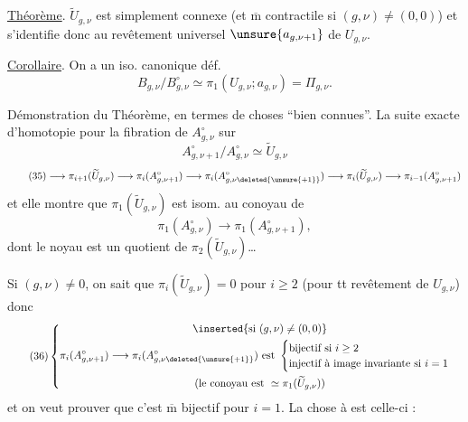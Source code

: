 \uline{Théorème}. $\widetilde U_{g,\nu}$ est simplement connexe  (et $\overline{\mathrm m}$ contractile si $(g,\nu)\ne(0,0)$) et s'identifie donc au revêtement universel   $\unsure{a_{g,\nu+1}}$ de $U_{g,\nu}$.


\uline{Corollaire}. On a un iso. canonique déf.
\[
\tag{34}
B_{g,\nu}/B_{g,\nu}^{\circ}\simeq\pi_1(U_{g,\nu};a_{g,\nu})=\Pi_{g,\nu}.
\]

Démonstration du Théorème, en termes de choses ``bien connues''. La  suite exacte d'homotopie pour la fibration de $A_{g,\nu}^{\circ}$ sur
\[
A_{g,\nu+1}^{\circ}/A_{g,\nu}^{\circ}\simeq\widetilde U_{g,\nu}
\]
\[
\tag{35}
\longrightarrow\pi_{i+1}(\widetilde U_{g,\nu})
\longrightarrow\pi_i(A_{g,\nu+1}^{\circ})
\longrightarrow\pi_i(A_{g,\nu\deleted{\unsure{+1}}}^{\circ})
\longrightarrow\pi_i(\widetilde U_{g,\nu})
\longrightarrow\pi_{i-1}(A_{g,\nu+1}^{\circ})
\]
et elle montre que $\pi_1(\widetilde U_{g,\nu})$ est isom. au conoyau de
\[
\pi_1(A_{g,\nu}^{\circ})\longrightarrow\pi_1(A_{g,\nu+1}^{\circ}),
\]
dont le noyau est un quotient de $\pi_2(\widetilde U_{g,\nu})$\ldots

Si $(g,\nu)\ne0$, on sait que $\pi_i(\widetilde U_{g,\nu})=0$ pour $i\geq2$ (pour tt revêtement de $U_{g,\nu}$) donc
\[
\tag{36}
\left\{\begin{gathered}
\inserted{\text{si }(g,\nu)\ne(0,0)}\\
\pi_i(A_{g,\nu+1}^{\circ})\longrightarrow\pi_i(A_{g,\nu\deleted{\unsure{+1}}}^{\circ})
\text{ est }\begin{cases}
\text{bijectif si }i\geq2\\
\text{injectif à image invariante si }i=1
\end{cases}\\
\text{(le conoyau est }\simeq\pi_1(\widetilde U_{g,\nu})\text{)}
\end{gathered}\right.
\]
et on veut prouver que c'est $\overline{\mathrm m}$ bijectif pour $i=1$. La chose à   est celle-ci :

